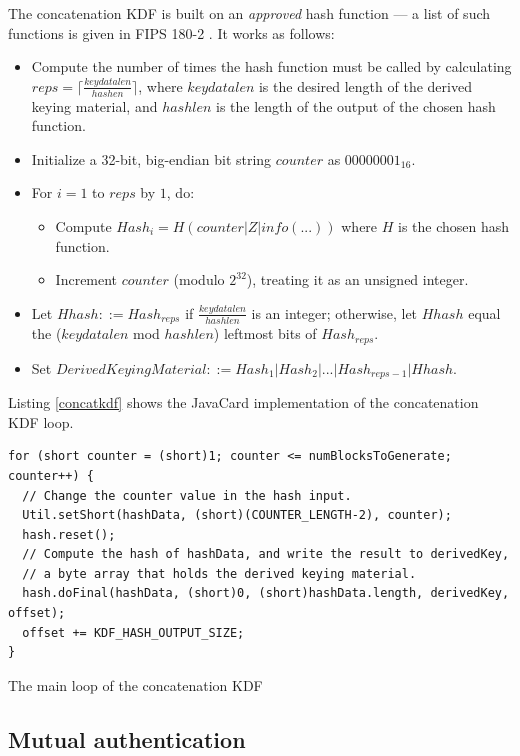 \documentclass[12pt,a4paper,twoside,openright]{report}
\begin{document}
The concatenation KDF is built on an \emph{approved} hash function --- a list of such functions is given in FIPS 180-2 \cite{fips1802}. It works as follows:

\begin{itemize}
\item Compute the number of times the hash function must be called by calculating $reps = \lceil \frac{keydatalen}{hashen} \rceil$, where $keydatalen$ is the desired length of the derived keying material, and $hashlen$ is the length of the output of the chosen hash function.
\item Initialize a 32-bit, big-endian bit string $counter$ as $00000001_{16}$.
\item For $i = 1$ to $reps$ by $1$, do:
	\begin{itemize}
	\item Compute $Hash_i = H(counter \vert Z \vert info(...))$ where $H$ is the chosen hash function.
	\item Increment $counter$ (modulo $2^{32}$), treating it as an unsigned integer.
	\end{itemize}
\item Let $Hhash ::= Hash_{reps}$ if $\frac{keydatalen}{hashlen}$ is an integer; otherwise, let $Hhash$ equal the ($keydatalen$ mod $hashlen$) leftmost bits of $Hash_{reps}$.
\item Set $DerivedKeyingMaterial ::= Hash_1 \vert Hash_2 \vert ... \vert Hash_{reps-1} \vert Hhash$.
\end{itemize}

\noindent
Listing \autoref{concatkdf} shows the JavaCard implementation of the concatenation KDF loop.

\begin{listing}
\begin{verbatim}
for (short counter = (short)1; counter <= numBlocksToGenerate; counter++) {
  // Change the counter value in the hash input.
  Util.setShort(hashData, (short)(COUNTER_LENGTH-2), counter);
  hash.reset();
  // Compute the hash of hashData, and write the result to derivedKey,
  // a byte array that holds the derived keying material.
  hash.doFinal(hashData, (short)0, (short)hashData.length, derivedKey, offset);
  offset += KDF_HASH_OUTPUT_SIZE;
}
\end{verbatim}
\caption{The main loop of the concatenation KDF}
\label{concatkdf}
\end{listing}

\subsection{Mutual authentication}
\label{sec:mutualauth}
\end{document}
